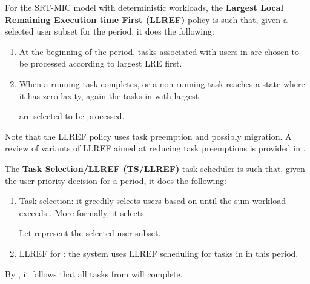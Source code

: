 \documentclass[prodmode,acmtompecs]{acmsmall}
\newcommand{\myComments}[1]{}
\newif\ifinfocom
\newif\iftompecs
\newif\ifdissertation
\newcommand{\infocomStart}{\ifinfocom \myComments{Infocom: }}
\newcommand{\tompecsStart}{\iftompecs \myComments{TOMPECS version: }}
\newcommand{\dissertationStart}{\ifdissertation  \myComments{Dissertation version: }}
\newcommand{\commentEnd}{\myComments{End}}
\begin{document}
\begin{definition}
\label{defn_LLREF}
For the SRT-MIC model with deterministic workloads, the {\bf Largest Local Remaining Execution time First (LLREF)} policy is such that, given a selected user subset  for the period, it does the following: 
\begin{enumerate}
\item At the beginning of the period,  tasks associated with users in  are chosen to be processed according to largest LRE first.
\item When a running task completes, or a non-running task reaches a state where it has zero laxity, again the  tasks in  with largest 
\infocomStart
LRE
\commentEnd\fi
\tompecsStart
local remaining execution time
\commentEnd\fi
are selected to be processed. 
\end{enumerate}
\end{definition}
Note that the LLREF policy uses task preemption and possibly migration. A review of variants of LLREF aimed at reducing task preemptions is provided in \cite{DaB11A}. 

\dissertationStart
Now we propose the following task scheduler. The framework is exhibited in Figure~{\ref{fig_LDF_TS_LLREF_framework}}. 
\commentEnd\fi

\begin{definition}
\label{defn_TS_LLREF}
The {\bf Task Selection/LLREF (TS/LLREF)} task scheduler is such that, given the user priority decision  for a period, it does the following: 
\begin{enumerate}
\item Task selection: it greedily selects users based on  until the sum workload exceeds . More formally, it selects

Let  represent the selected user subset. 
\dissertationStart
subset\footnote{One trivial way to extend the task selection step is to continue checking users greedily according to  and adding users to  while guaranteeing . But that does not improve the results in the sequel and therefore, we do not discuss this extension. }. 
\commentEnd\fi
\item LLREF for : the system uses LLREF scheduling for tasks in  in this period. 
\end{enumerate}
\end{definition}
By \cite{CRJ06A}, it follows that all tasks from  will complete. 

\dissertationStart
\begin{figure}[htp]
  \centering
  \texttt{[image: Figures/framework\_LDF\_TS\_LLREF.pdf]}
  \caption{The framework for LDF+TS/LLREF design. }
  \label{fig_LDF_TS_LLREF_framework}
\end{figure}
\commentEnd\fi
\end{document}
